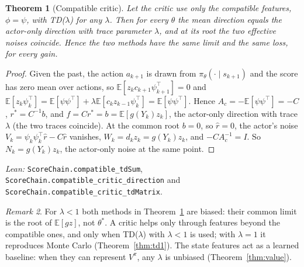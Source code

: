 \documentclass[11pt]{article}
\newtheorem{theorem}{Theorem}[section]
\theoremstyle{definition}
\theoremstyle{remark}
\newtheorem{remark}[theorem]{Remark}
\newcommand{\E}{\mathbb{E}}
\begin{document}
\begin{theorem}[Compatible critic]\label{thm:compat}
Let the critic use only the compatible features, $\phi = \psi$, with TD($\lambda$) for any $\lambda$.
Then for every $\theta$ the mean direction equals the actor-only direction with trace parameter
$\lambda$, and at its root the two effective noises coincide. Hence the two methods have the same
limit and the same loss, for every gain.
\end{theorem}
\begin{proof}
Given the past, the action $a_{k+1}$ is drawn from $\pi_\theta(\cdot\mid s_{k+1})$ and the score has
zero mean over actions, so $\E[z_kc_{k+1}\psi_{k+1}^\top] = 0$ and
$\E[z_k\psi_k^\top] = \E[\psi\psi^\top] + \lambda\E[c_kz_{k-1}\psi_k^\top] = \E[\psi\psi^\top]$. Hence
$A_c = -\E[\psi\psi^\top] = -C$, $r^* = C^{-1}b$, and $f = Cr^* = b = \E[g(Y_k)z_k]$, the actor-only
direction with trace $\lambda$ (the two traces coincide). At the common root $b = 0$, so $\hat r = 0$, the
actor's noise $V_k = \psi_k\psi_k^\top\hat r - C\hat r$ vanishes, $W_k = d_kz_k = g(Y_k)z_k$, and
$-CA_c^{-1} = I$. So $N_k = g(Y_k)z_k$, the actor-only noise at the same point.
\end{proof}
\noindent\emph{Lean:} \texttt{ScoreChain.compatible\_tdSum}, \texttt{ScoreChain.compatible\_critic\_direction}
and \texttt{ScoreChain.compatible\_critic\_tdMatrix}.

\begin{remark}
For $\lambda < 1$ both methods in Theorem~\ref{thm:compat} are biased: their common limit is the
root of $\E[gz]$, not $\theta^*$. A critic helps only through features beyond the compatible ones, and
only when TD($\lambda$) with $\lambda < 1$ is used; with $\lambda = 1$ it reproduces Monte Carlo
(Theorem~\ref{thm:td1}). The state features act as a learned baseline: when they can represent
$V^\pi$, any $\lambda$ is unbiased (Theorem~\ref{thm:value}).
\end{remark}
\end{document}
